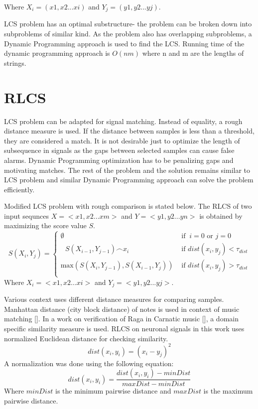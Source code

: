 \documentclass[MTech]{iitmdiss}
\begin{document}
Where $X_i = (x1, x2...xi)$ and $Y_j = (y1, y2...yj)$.

LCS problem has an optimal substructure- the problem can be broken down into subproblems of similar kind. As the problem also has overlapping subproblems, a Dynamic Programming approach is used to find the LCS. Running time of the dynamic programming approach is  $O(nm)$ where n and m are the lengths of strings.

\section{RLCS} %
\label{sec:rlcs}
LCS problem can be adapted for signal matching. Instead of equality, a rough distance measure is used. If the distance between samples is less than a threshold, they are considered a match. It is not desirable just to optimize the length of subsequence in signals as the gaps between selected samples can cause false alarms. Dynamic Programming optimization has to be penalizing gaps and motivating matches. The rest of the problem and the solution remains similar to LCS problem and similar Dynamic Programming approach can solve the problem efficiently.

Modified LCS problem with rough comparison is stated below. The RLCS of two input sequnces $X = <x1, x2...xm>$ and $Y = <y1, y2...yn>$ is obtained by maximizing the score value $S$.
$$
S\left(X_{i},Y_{j}\right) =
\begin{cases}
  \emptyset
& \mbox{ if }\ i = 0 \mbox{ or }  j = 0 \\
  \textrm{  } S\left(X_{i-1},Y_{j-1}\right) \frown x_{i}
& \mbox{ if } dist(x_i , y_j) < \tau_{dist} \\
  \mbox{max}\left(S\left(X_{i},Y_{j-1}\right),S\left(X_{i-1},Y_{j}\right)\right)
& \mbox{ if } dist(x_i , y_j) > \tau_{dist} \\
\end{cases}
$$
Where $X_i = <x1, x2...xi>$ and $Y_j = <y1, y2...yj>$.

Various context uses different distance measures for comparing samples.  Manhattan distance (city block distance) of notes is used in context of music matching [\cite{lin2011music}]. In a work on verification of Raga in Carnatic music [\cite{duttaraga}], a domain specific similarity measure is used. RLCS on neuronal signals in this work uses normalized Euclidean distance for checking similarity.
$$dist(x_i, y_i) = (x_i - y_j)^2$$
A normalization was done using the following equation:
$$dist(x_i, y_i) = \frac{dist(x_i, y_i) - minDist}{maxDist - minDist}$$
Where $minDist$ is the minimum pairwise distance and $maxDist$ is the maximum pairwise distance.
\end{document}
